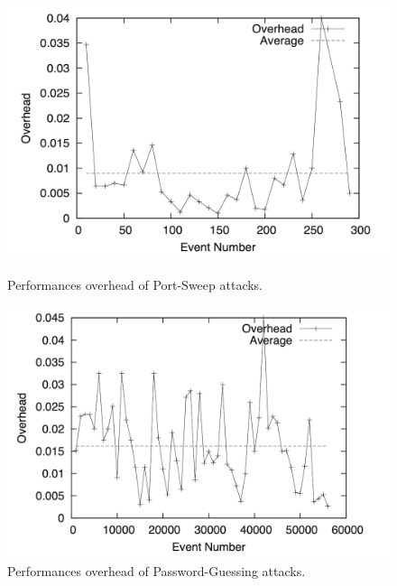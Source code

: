 \documentclass[english]{article}
\begin{document}
\begin{figure}[!htb]
    \begin{center}
        \begin{minipage}{0.45\textwidth}
            \centering
            \includegraphics[width=1.1\linewidth]{images/graph 1.png}
            \caption{Performances overhead of Port-Sweep attacks.}\label{graph1}
        \end{minipage}
        \hfill
        \begin{minipage}{0.45\textwidth}
            \centering
            \includegraphics[width=1.1\linewidth]{images/graph 2.png}
            \caption{Performances overhead of Password-Guessing attacks.}\label{graph2}
        \end{minipage}
    \end{center}
\end{figure}
\end{document}
